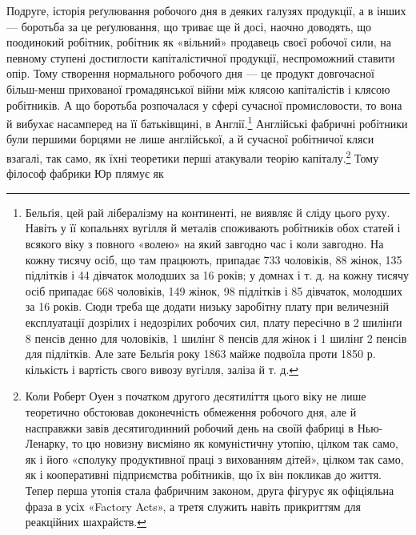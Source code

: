 Подруге, історія реґулювання робочого дня в деяких галузях
продукції, а в інших — боротьба за це реґулювання, що триває
ще й досі, наочно доводять, що поодинокий робітник, робітник як
«вільний» продавець своєї робочої сили, на певному ступені достиглости
капіталістичної продукції, неспроможний ставити опір.
Тому створення нормального робочого дня — це продукт довгочасної
більш-менш прихованої громадянської війни між клясою
капіталістів і клясою робітників. А що боротьба розпочалася
у сфері сучасної промисловости, то вона й вибухає насамперед
на її батьківщині, в Англії.\footnote{
Бельґія, цей рай лібералізму на континенті, не виявляє й сліду
цього руху. Навіть у її копальнях вугілля й металів споживають робітників
обох статей і всякого віку з повного «волею» на який завгодно час і
коли завгодно. На кожну тисячу осіб, що там працюють, припадає 733 чоловіків,
88 жінок, 135 підлітків і 44 дівчаток молодших за 16 років;
у домнах і т. д. на кожну тисячу осіб припадає 668 чоловіків, 149 жінок,
98 підлітків і 85 дівчаток, молодших за 16 років. Сюди треба ще додати
низьку заробітну плату при величезній експлуатації дозрілих і недозрілих
робочих сил, плату пересічно в 2 шилінґи 8 пенсів денно для чоловіків,
1 шилінґ 8 пенсів для жінок і 1 шилінґ 2 пенсів для підлітків.
Але зате Бельґія року 1863 майже подвоїла проти 1850 р. кількість і
вартість свого вивозу вугілля, заліза й т. д.
} Англійські фабричні робітники
були першими борцями не лише англійської, а й сучасної робітничої
кляси взагалі, так само, як їхні теоретики перші атакували
теорію капіталу.\footnote{
Коли Роберт Оуен з початком другого десятиліття цього віку не
лише теоретично обстоював доконечність обмеження робочого дня, але
й насправжки завів десятигодинний робочий день на своїй фабриці в
Нью-Ленарку, то цю новизну висміяно як комуністичну утопію, цілком
так само, як і його «сполуку продуктивної праці з вихованням дітей»,
цілком так само, як і кооперативні підприємства робітників, що їх він покликав
до життя. Тепер перша утопія стала фабричним законом, друга
фігурує як офіціяльна фраза в усіх «Factory Acts», а третя служить
навіть прикриттям для реакційних шахрайств.
} Тому філософ фабрики Юр плямує як
\parbreak{}  %
